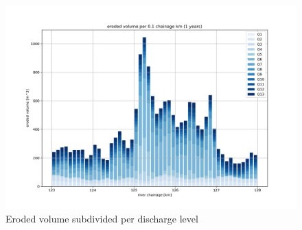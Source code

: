 \clearpage
\begin{figure}
\includegraphics[width=\textwidth]{figures/3_eroded_volume_per_discharge.png}
\caption{Eroded volume subdivided per discharge level}
\label{Fig2.6a}
\end{figure}

